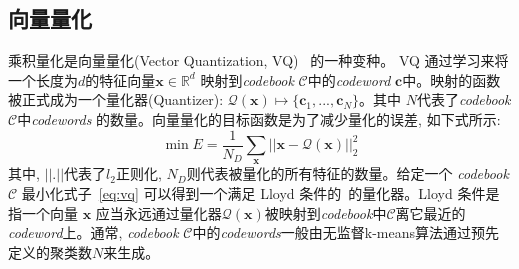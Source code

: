 \subsection{向量量化}
乘积量化是向量量化(Vector Quantization, VQ)~\cite{gray1984vector} 的一种变种。 VQ 通过学习来将一个长度为$d$的特征向量$\mathbf{x} \in \mathbb{R}^d$ 映射到\textit{codebook} $\mathcal{C}$中的\textit{codeword} $\textbf{c}$中。映射的函数被正式成为一个量化器(Quantizer):  $\mathcal{Q}(\mathbf{x}) \mapsto \{\mathbf{c}_1,...,\mathbf{c}_N\}$。其中 $N$代表了\textit{codebook} $\mathcal{C}$中\textit{codewords} 的数量。向量量化的目标函数是为了减少量化的误差, 如下式所示:
\begin{equation}
    \label{eq:vq}
      \min E = \frac{1}{N_{D}} \sum_{\mathbf{x}} ||\mathbf{x} - \mathcal{Q}(\mathbf{x}) ||^2_2
  \end{equation}
其中,  $||.||$代表了$l_2$正则化,  $N_{D}$则代表被量化的所有特征的数量。给定一个 \textit{codebook} $\mathcal{C}$ 最小化式子~\ref{eq:vq} 可以得到一个满足 Lloyd 条件的~\cite{gray1984vector}的量化器。Lloyd 条件是指一个向量 $\mathbf{x}$ 应当永远通过量化器$\mathcal{Q}(\mathbf{x})$被映射到\textit{codebook}中$\mathcal{C}$离它最近的\textit{codeword}上。通常, \textit{codebook} $\mathcal{C}$中的\textit{codewords}一般由无监督k-means算法通过预先定义的聚类数$N$来生成。
